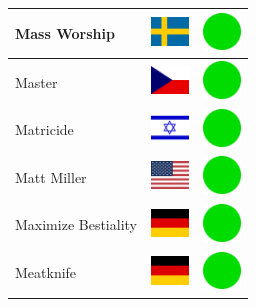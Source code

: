 \documentclass[12pt, a4paper, twoside]{report}
\begin{document}
\begin{center}
\begin{longtable}{|p{5cm}|p{2cm}|p{2cm}|}
 Mass Worship                                               & \includegraphics[width=1cm]{../img/flags/se} &   \includegraphics[width=1cm]{../likes/y} \\ \hline
 Master                                                     & \includegraphics[width=1cm]{../img/flags/cz} &   \includegraphics[width=1cm]{../likes/y} \\ \hline
 Matricide                                                  & \includegraphics[width=1cm]{../img/flags/il} &   \includegraphics[width=1cm]{../likes/y} \\ \hline
 Matt Miller                                                & \includegraphics[width=1cm]{../img/flags/us} &   \includegraphics[width=1cm]{../likes/y} \\ \hline
 Maximize Bestiality                                        & \includegraphics[width=1cm]{../img/flags/de} &   \includegraphics[width=1cm]{../likes/y} \\ \hline
 Meatknife                                                  & \includegraphics[width=1cm]{../img/flags/de} &   \includegraphics[width=1cm]{../likes/y} \\ \hline

\end{longtable}
\end{center}
\end{document}
